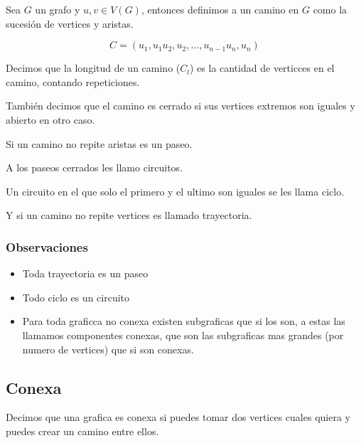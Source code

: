 \documentclass[12pt, fleqn]{report}                             %
\theoremstyle{break}                                            %
\begin{document}
                Sea $G$ un grafo y $u, v\in V(G)$, entonces definimos a un camino en $G$ como
                la sucesión de vertices y aristas.

                \begin{equation*}
                    C = (u_1, u_1u_2, u_2, \dots, u_{n-1}u_n, u_n) 
                \end{equation*}

                Decimos que la longitud de un camino ($C_l$) es la cantidad de verticces en el camino, contando
                repeticiones.

                También decimos que el camino es cerrado si sus vertices extremos son iguales y abierto en otro caso.

                Si un camino no repite aristas es un paseo.

                A los paseos cerrados les llamo circuitos.

                Un circuito en el que solo el primero y el ultimo son iguales se les llama ciclo.
                
                Y si un camino no repite vertices es llamado trayectoria.

                \subsubsection{Observaciones}

                \begin{itemize}
                    \item Toda trayectoria es un paseo
                    \item Todo ciclo es un circuito
                    \item Para toda graficca no conexa existen subgraficas que si los son, a estas
                    las llamamos componentes conexas, que son las subgraficas mas grandes (por numero de vertices)
                    que si son conexas.
                \end{itemize}

                
            \subsection{Conexa}

                Decimos que una grafica es conexa si puedes tomar dos vertices cuales quiera
                y puedes crear un camino entre ellos.
\end{document}
